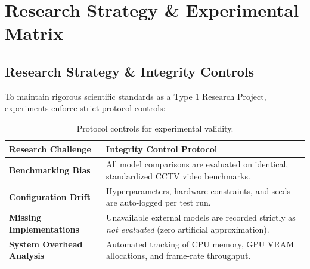 \documentclass[11pt, a4paper]{article}
\begin{document}
\section{Research Strategy \& Experimental Matrix}

\subsection{Research Strategy \& Integrity Controls}
To maintain rigorous scientific standards as a Type 1 Research Project, experiments enforce strict protocol controls:

\begin{table}[H]
\centering
\small
\renewcommand{\arraystretch}{1.3}
\begin{tabularx}{\textwidth}{|>{\hsize=0.35\hsize\bfseries}X|>{\hsize=0.65\hsize}X|}
\hline
\textbf{Research Challenge} & \textbf{Integrity Control Protocol} \\
\hline
Benchmarking Bias & All model comparisons are evaluated on identical, standardized CCTV video benchmarks. \\
\hline
Configuration Drift & Hyperparameters, hardware constraints, and seeds are auto-logged per test run. \\
\hline
Missing Implementations & Unavailable external models are recorded strictly as \textit{not evaluated} (zero artificial approximation). \\
\hline
System Overhead Analysis & Automated tracking of CPU memory, GPU VRAM allocations, and frame-rate throughput. \\
\hline
\end{tabularx}
\caption{Protocol controls for experimental validity.}
\end{table}
\end{document}
